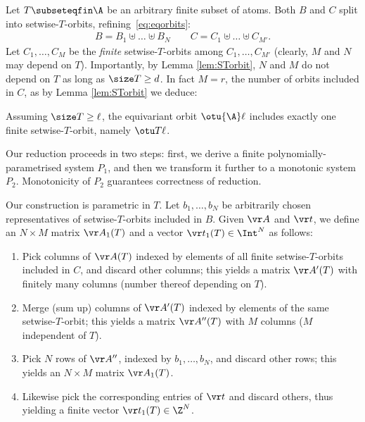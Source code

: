 Let $T\subseteqfin \A$ be an arbitrary finite subset of atoms. %
Both $B$ and $C$ split into setwise-$T$-orbits, refining~\eqref{eq:eqorbits}:
\begin{align} \label{eq:BC}
B = B_1 \uplus \ldots \uplus B_N \qquad
C = C_1 \uplus \ldots \uplus C_{M'}.
\end{align}
Let $C_1, \ldots, C_M$ be the \emph{finite} setwise-$T$-orbits among $C_1, \ldots, C_{M'}$
(clearly, $M$ and $N$ may depend on $T$).
%
Importantly, by Lemma \ref{lem:STorbit}, $N$ and $M$ do not depend on $T$ as long as $\size T\geq d$.
In fact $M = r$, the number of orbits included in $C$, as
by Lemma \ref{lem:STorbit} we deduce:
%
\begin{lemma} \label{lem:Tk}
Assuming $\size T \geq \ell$, the equivariant orbit $\otu {\A} \ell$ includes exactly one finite setwise-$T$-orbit, namely
$\otu T \ell$.
\end{lemma}
%
Our reduction proceeds in two steps:  first, %
we derive a finite
polynomially-parametrised system $P_1$, and then
we transform it further to a monotonic system $P_2$.
Monotonicity of $P_2$ guarantees correctness of reduction.

Our construction is parametric in $T$.
Let $b_1, \ldots, b_N$ be arbitrarily chosen representatives of setwise-$T$-orbits included in $B$.
%
Given $\vr A$ and $\vr t$,
we define an $N{\times}M$ matrix $\vr A_1(T)$ and a vector $\vr t_1(T) \in \Int^N$ as follows:
%
\begin{enumerate}
\item[(1)] 
Pick columns of $\vr A(T)$ indexed
by elements of all finite setwise-$T$-orbits included in $C$, and discard other columns; this yields a matrix 
$\vr A'(T)$ with finitely many columns (number thereof depending on $T$).
\item[(2)] 
Merge (sum up) columns of $\vr A'(T)$ indexed by elements of the same setwise-$T$-orbit; this yields a matrix $\vr A''(T)$ with $M$ columns ($M$ independent of $T$). 
\item [(3)]
Pick $N$ rows of $\vr A''$, indexed by $b_1, \ldots, b_N$,
and discard other rows; this yields an $N\times M$ matrix $\vr A_1(T)$.
\item[(4)] Likewise pick the corresponding entries of $\vr t$ and discard others, thus yielding a finite vector $\vr t_1(T)\in\Z^N$.
\end{enumerate}


